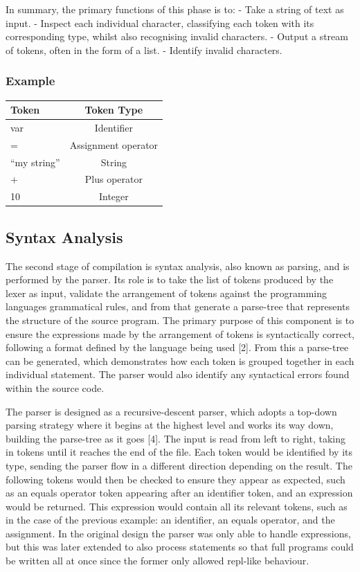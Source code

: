 \documentclass[
]{report}
\begin{document}
In summary, the primary functions of this phase is to: - Take a string
of text as input. - Inspect each individual character, classifying each
\gls{token} with its corresponding type, whilst also recognising invalid
characters. - Output a stream of \glspl{token}, often in the form of a list. -
Identify invalid characters.

\subsubsection{Example}
\begin{longtable}[l]{@{}lc@{}}
\toprule
Token & Token Type\tabularnewline
\midrule
\endhead
var & Identifier\tabularnewline
= & Assignment operator\tabularnewline
``my string'' & String\tabularnewline
+ & Plus operator\tabularnewline
10 & Integer\tabularnewline
\bottomrule
\end{longtable}

\subsection{Syntax Analysis}
The second stage of compilation is syntax analysis, also known as
\gls{parsing}, and is performed by the parser. Its role is to take the list of
\glspl{token} produced by the lexer as input, validate the arrangement of
\glspl{token} against the programming languages grammatical rules, and from
that generate a \gls{parse-tree} that represents the structure of the source
program. The primary purpose of this component is to ensure the
\glspl{expression} made by the arrangement of \glspl{token} is syntactically correct,
following a format defined by the language being used {[}2{]}. From this
a \gls{parse-tree} can be generated, which demonstrates how each \gls{token} is
grouped together in each individual \gls{statement}. The parser would also
identify any syntactical errors found within the source code.

The parser is designed as a \gls{recursive-descent parser}, which adopts a
top-down \gls{parsing} strategy where it begins at the highest level and works
its way down, building the \gls{parse-tree} as it goes {[}4{]}. The input is
read from left to right, taking in \glspl{token} until it reaches the end of
the file. Each \gls{token} would be identified by its type, sending the parser
flow in a different direction depending on the result. The following
\glspl{token} would then be checked to ensure they appear as expected, such as
an equals operator \gls{token} appearing after an \gls{identifier} \gls{token}, and an
\gls{expression} would be returned. This \gls{expression} would contain all its
relevant \glspl{token}, such as in the case of the previous example: an
\gls{identifier}, an equals operator, and the assignment. In the original
design the parser was only able to handle \glspl{expression}, but this was
later extended to also process \glspl{statement} so that full programs could be
written all at once since the former only allowed \acrshort{repl}-like behaviour.
\end{document}
